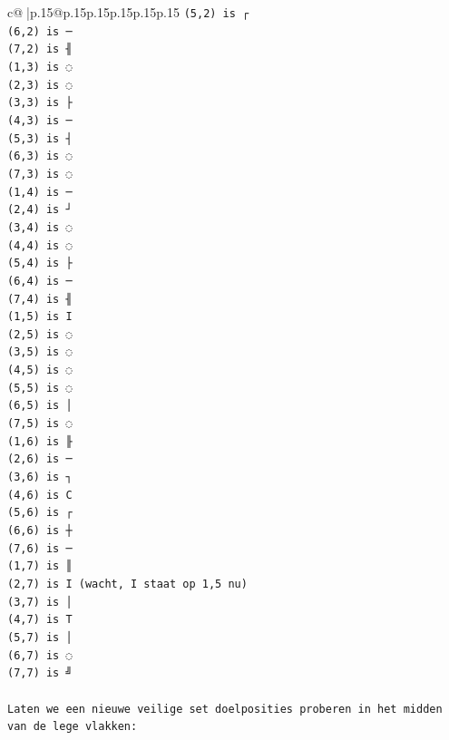\documentclass{article}
\begin{document}
{\begin{supertabular}{c@{$\;$}|p{.15\linewidth}@{}p{.15\linewidth}p{.15\linewidth}p{.15\linewidth}p{.15\linewidth}p{.15\linewidth}}
{{{\texttt{(5,2) is ┌} \\
\texttt{(6,2) is ─} \\
\texttt{(7,2) is ╢} \\
\texttt{(1,3) is ◌} \\
\texttt{(2,3) is ◌} \\
\texttt{(3,3) is ├} \\
\texttt{(4,3) is ─} \\
\texttt{(5,3) is ┤} \\
\texttt{(6,3) is ◌} \\
\texttt{(7,3) is ◌} \\
\texttt{(1,4) is ─} \\
\texttt{(2,4) is ┘} \\
\texttt{(3,4) is ◌} \\
\texttt{(4,4) is ◌} \\
\texttt{(5,4) is ├} \\
\texttt{(6,4) is ─} \\
\texttt{(7,4) is ╢} \\
\texttt{(1,5) is I} \\
\texttt{(2,5) is ◌} \\
\texttt{(3,5) is ◌} \\
\texttt{(4,5) is ◌} \\
\texttt{(5,5) is ◌} \\
\texttt{(6,5) is │} \\
\texttt{(7,5) is ◌} \\
\texttt{(1,6) is ╟} \\
\texttt{(2,6) is ─} \\
\texttt{(3,6) is ┐} \\
\texttt{(4,6) is C} \\
\texttt{(5,6) is ┌} \\
\texttt{(6,6) is ┼} \\
\texttt{(7,6) is ─} \\
\texttt{(1,7) is ║} \\
\texttt{(2,7) is I (wacht, I staat op 1,5 nu)} \\
\texttt{(3,7) is │} \\
\texttt{(4,7) is T} \\
\texttt{(5,7) is │} \\
\texttt{(6,7) is ◌} \\
\texttt{(7,7) is ╝} \\
\\ 
\texttt{Laten we een nieuwe veilige set doelposities proberen in het midden van de lege vlakken:} \\
}}}
\end{supertabular}}
\end{document}
